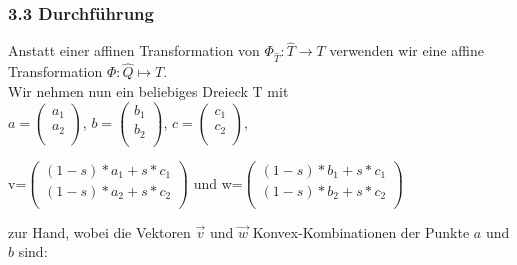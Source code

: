 \documentclass[a4paper,11pt,bibliography=totoc,listof=totoc,headinclude=true,cleardoublepage=empty,oneside]{scrbook}
\begin{document}
		\vspace{5mm}
		\subsubsection{3.3 Durchführung}
		
		Anstatt einer affinen Transformation von $ \Phi_{\hat{T}}:\hat{T} \to T$ verwenden wir eine affine Transformation $\Phi:\hat{Q} \mapsto T$. \\
		
		Wir nehmen nun ein beliebiges Dreieck T mit \\
		
		 $a=\left(
		\begin{array}{ccc}
		a_1 \\
		a_2\\
		\end{array}
		\right)$, $b=\left(
		\begin{array}{ccc}
			b_1 \\
			b_2\\
		\end{array}
		\right)$, $c=\left(
		\begin{array}{ccc}
			c_1 \\
			c_2\\
		\end{array}
		\right)$, 
		\vspace{3mm}
		
		
		
		v=$\left(
		\begin{array}{ccc}
		(1-s)*a_1+ s*c_1\\
		(1-s)*a_2+s*c_2\\
		\end{array}
		\right)$ 	und w=$\left(
		\begin{array}{ccc}
			(1-s)*b_1+ s*c_1\\
			(1-s)*b_2+s*c_2\\
		\end{array}
		\right)$
		
		\vspace{5mm}
		zur Hand, wobei die Vektoren $\vec{v}$ und $\vec{w}$ Konvex-Kombinationen der Punkte $a$ und $b$ sind:
		
		\vspace{4mm}
		
	\hspace{3.6cm}	
	
\end{document}
